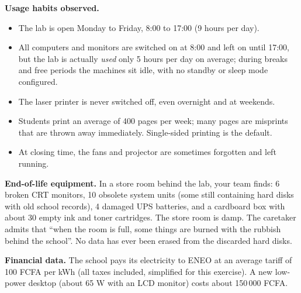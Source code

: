 \documentclass[11pt]{article}
\newcounter{popsec}
\newcounter{popsub}
\newcommand{\courssub}[1]{%
  \stepcounter{popsub}%
  \par\vspace{9pt}\noindent{\popxbold\fontsize{11.5}{13}\selectfont\color{popink}{\color{poporange}\thepopsec.\thepopsub}\hspace{6pt}#1}\par\nopagebreak\vspace{4pt}
}
\begin{document}
\textbf{Usage habits observed.}
\begin{itemize}
\item The lab is open Monday to Friday, 8:00 to 17:00 (9 hours per day).
\item All computers and monitors are switched on at 8:00 and left on until 17:00, but the lab is actually \emph{used} only 5 hours per day on average; during breaks and free periods the machines sit idle, with no standby or sleep mode configured.
\item The laser printer is never switched off, even overnight and at weekends.
\item Students print an average of 400 pages per week; many pages are misprints that are thrown away immediately. Single-sided printing is the default.
\item At closing time, the fans and projector are sometimes forgotten and left running.
\end{itemize}

\textbf{End-of-life equipment.} In a store room behind the lab, your team finds: 6 broken CRT monitors, 10 obsolete system units (some still containing hard disks with old school records), 4 damaged UPS batteries, and a cardboard box with about 30 empty ink and toner cartridges. The store room is damp. The caretaker admits that ``when the room is full, some things are burned with the rubbish behind the school''. No data has ever been erased from the discarded hard disks.

\textbf{Financial data.} The school pays its electricity to ENEO at an average tariff of 100 FCFA per kWh (all taxes included, simplified for this exercise). A new low-power desktop (about 65 W with an LCD monitor) costs about 150\,000 FCFA.

\courssub{Tasks}
\end{document}
